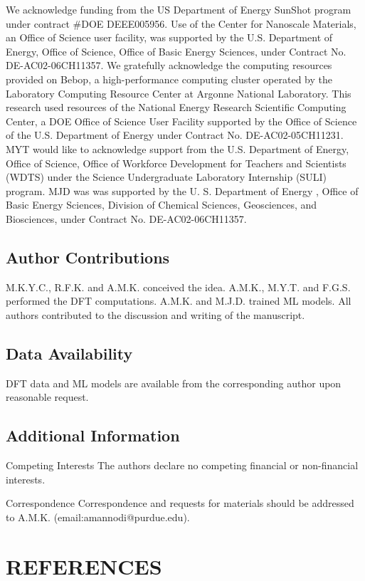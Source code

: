 \documentclass[aip, jmp, amsmath, amssymb, preprint]{revtex4-2}
\begin{document}
\begin{addendum}

We acknowledge funding from the US Department of Energy SunShot program under contract #DOE DEEE005956. Use of the Center for Nanoscale Materials, an Office of Science user facility, was supported by the U.S. Department of Energy, Office of Science, Office of Basic Energy Sciences, under Contract No. DE-AC02-06CH11357. We gratefully acknowledge the computing resources provided on Bebop, a high-performance computing cluster operated by the Laboratory Computing Resource Center at Argonne National Laboratory. This research used resources of the National Energy Research Scientific Computing Center, a DOE Office of Science User Facility supported by the Office of Science of the U.S. Department of Energy under Contract No. DE-AC02-05CH11231. MYT would like to acknowledge support from the U.S. Department of Energy, Office of Science, Office of Workforce Development for Teachers and Scientists (WDTS) under the Science Undergraduate Laboratory Internship (SULI) program. MJD was was supported by the U. S. Department of Energy , Office of Basic Energy Sciences, Division of Chemical Sciences, Geosciences, and Biosciences, under Contract No. DE-AC02-06CH11357.

\subsection*{Author Contributions} M.K.Y.C., R.F.K. and A.M.K. conceived the idea. A.M.K., M.Y.T. and F.G.S. performed the DFT computations. A.M.K. and M.J.D. trained ML models. All authors contributed to the discussion and writing of the manuscript.

\subsection*{Data Availability} DFT data and ML models are available from the corresponding author upon reasonable request.


\subsection*{Additional Information}
\item[Competing Interests] The authors declare no competing financial or non-financial interests.
\item[Correspondence] Correspondence and requests for materials
should be addressed to A.M.K. (email:amannodi@purdue.edu).
\end{addendum}



\section*{REFERENCES}

\end{document}
